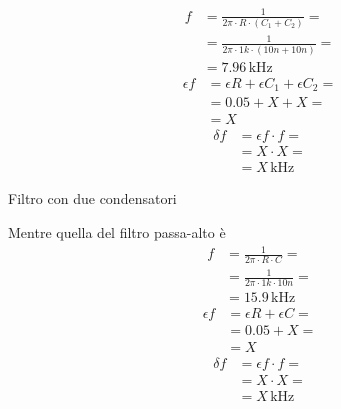 \documentclass{article}
\begin{document}
			\begin{minipage}[t]{0.5\textwidth}
				\centering
				\begin{equation*}
					\begin{split}
						f &= \frac{1}{2 \pi \cdot R \cdot (C_{1} + C_{2})} = \\
						  &= \frac{1}{2 \pi \cdot 1k \cdot (10n + 10n)} = \\
						  &= 7.96 \, \mathrm{kHz}
					\end{split}
				\end{equation*}
				\newline
				\begin{equation*}
					\begin{split}
						\epsilon f &= \epsilon R + \epsilon C_{1} + \epsilon C_{2} = \\
								   &= 0.05 + X + X = \\
								   &= X
					\end{split}
				\end{equation*}
				\newline
				\begin{equation*}
					\begin{split}
						\delta f &= \epsilon f \cdot f = \\
								 &= X \cdot X = \\
								 &= X \, \mathrm{kHz}
					\end{split}
				\end{equation*}
				\newline
				\begin{scriptsize}
					Filtro con due condensatori
				\end{scriptsize}
			\end{minipage}
			Mentre quella del filtro passa-alto è
			\begin{equation*}
				\begin{split}
					f &= \frac{1}{2 \pi \cdot R \cdot C} = \\
					  &= \frac{1}{2 \pi \cdot 1k \cdot 10n} = \\
					  &= 15.9 \, \mathrm{kHz}
				\end{split}
			\end{equation*}
			\newline
			\begin{equation*}
				\begin{split}
					\epsilon f &= \epsilon R + \epsilon C = \\
							   &= 0.05 + X = \\
							   &= X
				\end{split}
			\end{equation*}
			\newline
			\begin{equation*}
				\begin{split}
					\delta f &= \epsilon f \cdot f = \\
							 &= X \cdot X = \\
							 &= X \, \mathrm{kHz}
				\end{split}
			\end{equation*}
\end{document}
